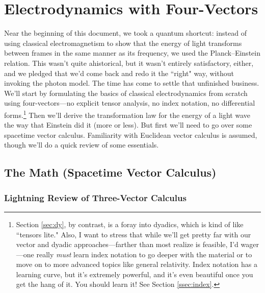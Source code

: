 \documentclass[12pt]{article}
\begin{document}
\clearpage


\section{Electrodynamics with Four-Vectors}\label{sec:rem}

Near the beginning of this document, we took a quantum shortcut: instead of using classical electromagnetism to show that the energy of light transforms between frames in the same manner as its frequency, we used the Planck--Einstein relation. This wasn't quite ahistorical, but it wasn't entirely satisfactory, either, and we pledged that we'd come back and redo it the ``right" way, without invoking the photon model. The time has come to settle that unfinished business. We'll start by formulating the basics of classical electrodynamics from scratch using four-vectors---no explicit tensor analysis, no index notation, no differential forms.\footnote{Section \ref{sec:dy}, by contrast, is a foray into dyadics, which is kind of like ``tensors lite." Also, I want to stress that while we'll get pretty far with our vector and dyadic approaches---farther than most realize is feasible, I'd wager---one really \emph{must} learn index notation to go deeper with the material or to move on to more advanced topics like general relativity. Index notation has a learning curve, but it's extremely powerful, and it's even beautiful once you get the hang of it. You should learn it! See Section \ref{ssec:index}.} Then we'll derive the transformation law for the energy of a light wave the way that Einstein did it (more or less). But first we'll need to go over some spacetime vector calculus. Familiarity with Euclidean vector calculus is assumed, though we'll do a quick review of some essentials.


\subsection{The Math (Spacetime Vector Calculus)}

\subsubsection{Lightning Review of Three-Vector Calculus}\label{sssec:vectorcalc}
\end{document}
